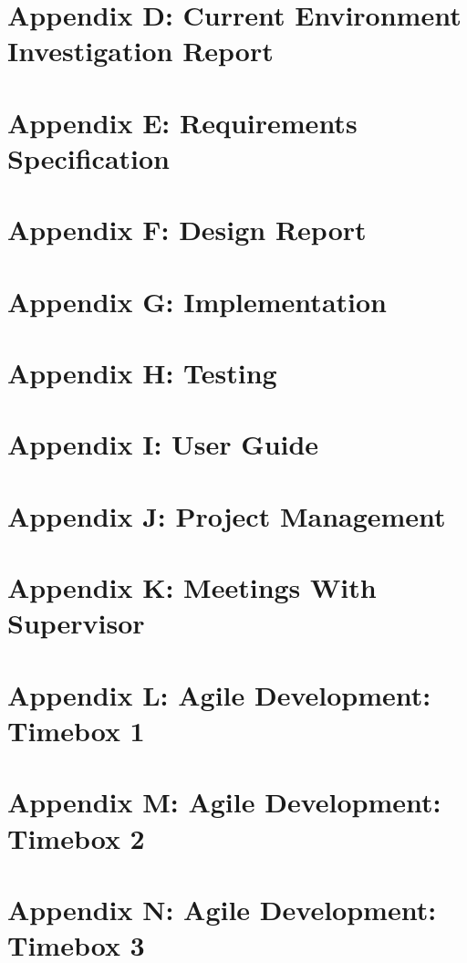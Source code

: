 \documentclass[journal, draftcls]{IEEEtran}
\begin{document}
\section*{Appendix D: Current Environment Investigation Report}
\section*{Appendix E: Requirements Specification}
\section*{Appendix F: Design Report}
\section*{Appendix G: Implementation}
\section*{Appendix H: Testing}
\section*{Appendix I: User Guide}
\section*{Appendix J: Project Management}
\section*{Appendix K: Meetings With Supervisor}
\section*{Appendix L: Agile Development: Timebox 1}
\section*{Appendix M: Agile Development: Timebox 2}
\section*{Appendix N: Agile Development: Timebox 3}
\end{document}
